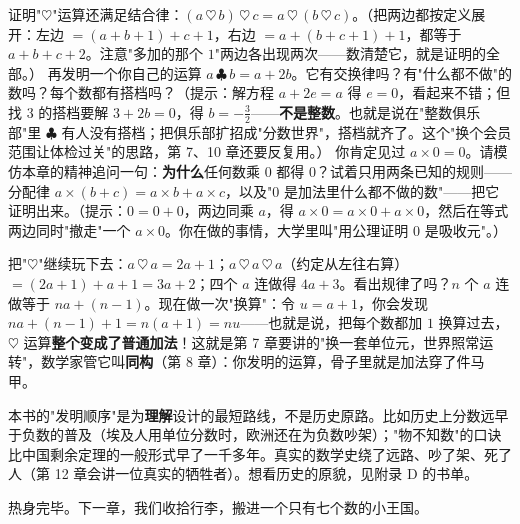 \begin{dongshou}
\begin{itemize}
  \yisi 证明"$\heartsuit$"运算还满足结合律：$(a\,\heartsuit\,b)\,\heartsuit\,c = a\,\heartsuit\,(b\,\heartsuit\,c)$。（把两边都按定义展开：左边 $= (a+b+1)+c+1$，右边 $= a+(b+c+1)+1$，都等于 $a+b+c+2$。注意"多加的那个 $1$"两边各出现两次——数清楚它，就是证明的全部。）
  \yier 再发明一个你自己的运算 $a\,\clubsuit\,b = a + 2b$。它有交换律吗？有"什么都不做"的数吗？每个数都有搭档吗？（提示：解方程 $a + 2e = a$ 得 $e = 0$，看起来不错；但找 $3$ 的搭档要解 $3 + 2b = 0$，得 $b = -\tfrac32$——\textbf{不是整数}。也就是说在"整数俱乐部"里 $\clubsuit$ 有人没有搭档；把俱乐部扩招成"分数世界"，搭档就齐了。这个"换个会员范围让体检过关"的思路，第 7、10 章还要反复用。）
  \yier 你肯定见过 $a \times 0 = 0$。请模仿本章的精神追问一句：\textbf{为什么}任何数乘 $0$ 都得 $0$？试着只用两条已知的规则——分配律 $a\times(b+c) = a\times b + a\times c$，以及"$0$ 是加法里什么都不做的数"——把它证明出来。（提示：$0 = 0 + 0$，两边同乘 $a$，得 $a\times 0 = a\times 0 + a\times 0$，然后在等式两边同时"撤走"一个 $a\times 0$。你在做的事情，大学里叫"用公理证明 $0$ 是吸收元"。）
\end{itemize}
\end{dongshou}

\begin{shaonao}
把"$\heartsuit$"继续玩下去：$a \,\heartsuit\, a = 2a + 1$；$a \,\heartsuit\, a \,\heartsuit\, a$（约定从左往右算）$= (2a+1) + a + 1 = 3a + 2$；四个 $a$ 连做得 $4a+3$。看出规律了吗？$n$ 个 $a$ 连做等于 $na + (n-1)$。现在做一次"换算"：令 $u = a + 1$，你会发现 $na + (n-1) + 1 = n(a+1) = nu$——也就是说，把每个数都加 $1$ 换算过去，$\heartsuit$ 运算\textbf{整个变成了普通加法}！这就是第 7 章要讲的"换一套单位元，世界照常运转"，数学家管它叫\textbf{同构}（第 8 章）：你发明的运算，骨子里就是加法穿了件马甲。
\end{shaonao}

\begin{chengshi}
本书的"发明顺序"是为\textbf{理解}设计的最短路线，不是历史原路。比如历史上分数远早于负数的普及（埃及人用单位分数时，欧洲还在为负数吵架）；"物不知数"的口诀比中国剩余定理的一般形式早了一千多年。真实的数学史绕了远路、吵了架、死了人（第 12 章会讲一位真实的牺牲者）。想看历史的原貌，见附录 D 的书单。
\end{chengshi}

热身完毕。下一章，我们收拾行李，搬进一个只有七个数的小王国。
